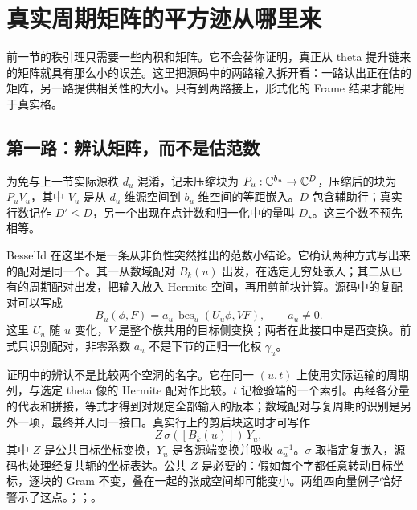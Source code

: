 \section{真实周期矩阵的平方迹从哪里来}
前一节的秩引理只需要一些内积和矩阵。它不会替你证明，真正从 theta 提升链来的矩阵就具有那么小的误差。这里把源码中的两路输入拆开看：一路认出正在估的矩阵，另一路提供相关性的大小。只有到两路接上，形式化的 Frame 结果才能用于真实格。

\subsection{第一路：辨认矩阵，而不是估范数}
为免与上一节实际源秩 $d_u$ 混淆，记未压缩块为 $P_u:\mathbb C^{b_u}\to\mathbb C^D$，压缩后的块为 $P_uV_u$，其中 $V_u$ 是从 $d_u$ 维源空间到 $b_u$ 维空间的等距嵌入。$D$ 包含辅助行；真实行数记作 $D'\le D$，另一个出现在点计数和归一化中的量叫 $D_\star$。这三个数不预先相等。

BesselId 在这里不是一条从非负性突然推出的范数小结论。它确认两种方式写出来的配对是同一个。其一从数域配对 $B_k(u)$ 出发，在选定无穷处嵌入；其二从已有的周期配对出发，把输入放入 Hermite 空间，再用剪前块计算。源码中的复配对可以写成
\[
 B_u(\phi,F)=a_u\,
     \operatorname{bes}_u(U_u\phi,VF),
 \qquad a_u\ne0.
\]
这里 $U_u$ 随 $u$ 变化，$V$ 是整个族共用的目标侧变换；两者在此接口中是酉变换。前式只识别配对，非零系数 $a_u$ 不是下节的正归一化权 $\gamma_u$。

证明中的辨认不是比较两个空洞的名字。它在同一 $(u,t)$ 上使用实际运输的周期列，与选定 theta 像的 Hermite 配对作比较。$t$ 记检验端的一个索引。再经各分量的代表和拼接，等式才得到对规定全部输入的版本；数域配对与复周期的识别是另外一项，最终并入同一接口。真实行上的剪后块这时才可写作
\[
                  Z\,\sigma([B_k(u)])\,Y_u ,
\]
其中 $Z$ 是公共目标坐标变换，$Y_u$ 是各源端变换并吸收 $a_u^{-1}$。$\sigma$ 取指定复嵌入，源码也处理经复共轭的坐标表达。公共 $Z$ 是必要的：假如每个字都任意转动目标坐标，逐块的 Gram 不变，叠在一起的张成空间却可能变小。两组四向量例子恰好警示了这点。；；。


